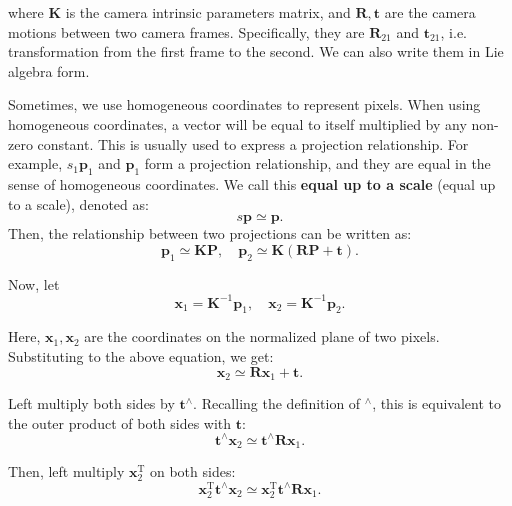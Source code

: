 where $\mathbf{K}$ is the camera intrinsic parameters matrix, and $\mathbf{R}, \mathbf{t}$ are the camera motions between two camera frames. Specifically, they are $\mathbf{R}_{21}$ and $\mathbf{t}_{21}$, i.e. transformation from the first frame to the second. We can also write them in Lie algebra form.

Sometimes, we use homogeneous coordinates to represent pixels. When using homogeneous coordinates, a vector will be equal to itself multiplied by any non-zero constant. This is usually used to express a projection relationship. For example, $s_1 \mathbf{p}_1$ and $\mathbf{p}_1$ form a projection relationship, and they are equal in the sense of homogeneous coordinates. We call this \textbf{equal up to a scale} (equal up to a scale), denoted as:
\begin{equation}
s\mathbf{p} \simeq \mathbf{p}.
\end{equation}
Then, the relationship between two projections can be written as:
\begin{equation}
 {\mathbf{p}_1} \simeq \mathbf{KP},\quad \mathbf{p}_2 \simeq \mathbf{K}\left( \mathbf{RP + t} \right).
\end{equation}

Now, let
\begin{equation}
{\mathbf{x}_1} = {\mathbf{K}^{ - 1}}{\mathbf{p}_1}, \quad {\mathbf{x}_2} = {\mathbf{K}^{ - 1}}{\mathbf{p}_2}.
\end{equation}

Here, $\mathbf{x}_1, \mathbf{x}_2$ are the coordinates on the normalized plane of two pixels. Substituting to the above equation, we get:
\begin{equation}
{\mathbf{x}_2} \simeq \mathbf{R} {\mathbf{x}_1} + \mathbf{t}.
\end{equation}

Left multiply both sides by $\mathbf{t}^\wedge$. Recalling the definition of $^\wedge$, this is equivalent to the outer product of both sides with $\mathbf{t}$:
\begin{equation}
\mathbf{t}^\wedge \mathbf{x}_2 \simeq \mathbf{t}^\wedge \mathbf{R} \mathbf{x}_1.
\end{equation}

Then, left multiply $\mathbf{x}_2^\mathrm{T}$ on both sides:
\begin{equation}
\mathbf{x}_2^\mathrm{T} \mathbf{t}^\wedge \mathbf{x}_2 \simeq \mathbf{x}_2^\mathrm{T} \mathbf{t}^\wedge \mathbf{R} \mathbf{x}_1.
\end{equation}

